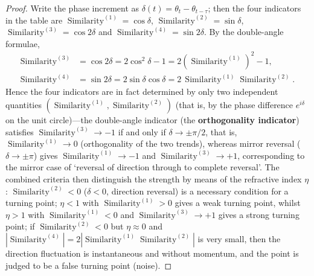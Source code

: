 \begin{proof}
Write the phase increment as $\delta(t) = \theta_t - \theta_{t-\tau}$; then the four indicators in the table are $\operatorname{Similarity}^{(1)} = \cos\delta$, $\operatorname{Similarity}^{(2)} = \sin\delta$, $\operatorname{Similarity}^{(3)} = \cos 2\delta$ and $\operatorname{Similarity}^{(4)} = \sin 2\delta$. By the double-angle formulae,
\[
\begin{aligned}
\operatorname{Similarity}^{(3)} &= \cos 2\delta = 2\cos^2\delta - 1 = 2(\operatorname{Similarity}^{(1)})^2 - 1, \\
\operatorname{Similarity}^{(4)} &= \sin 2\delta = 2\sin\delta\cos\delta = 2\,\operatorname{Similarity}^{(1)}\operatorname{Similarity}^{(2)}.
\end{aligned}
\]
Hence the four indicators are in fact determined by only two independent quantities $(\operatorname{Similarity}^{(1)}, \operatorname{Similarity}^{(2)})$ (that is, by the phase difference $e^{i\delta}$ on the unit circle)---the double-angle indicator (the \textbf{orthogonality indicator}) satisfies $\operatorname{Similarity}^{(3)} \to -1$ if and only if $\delta \to \pm\pi/2$, that is, $\operatorname{Similarity}^{(1)} \to 0$ (orthogonality of the two trends), whereas mirror reversal ($\delta \to \pm\pi$) gives $\operatorname{Similarity}^{(1)} \to -1$ and $\operatorname{Similarity}^{(3)} \to +1$, corresponding to the mirror case of `reversal of direction through to complete reversal'. The combined criteria then distinguish the strength by means of the refractive index $\eta$: $\operatorname{Similarity}^{(2)} < 0$ ($\delta < 0$, direction reversal) is a necessary condition for a turning point; $\eta < 1$ with $\operatorname{Similarity}^{(1)} > 0$ gives a weak turning point, whilst $\eta > 1$ with $\operatorname{Similarity}^{(1)} < 0$ and $\operatorname{Similarity}^{(3)} \to +1$ gives a strong turning point; if $\operatorname{Similarity}^{(2)} < 0$ but $\eta \approx 0$ and $|\operatorname{Similarity}^{(4)}| = 2|\operatorname{Similarity}^{(1)}\operatorname{Similarity}^{(2)}|$ is very small, then the direction fluctuation is instantaneous and without momentum, and the point is judged to be a false turning point (noise).
\end{proof}

